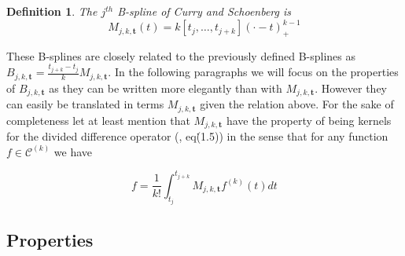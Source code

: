 \documentclass[a4paper, 11pt]{article}
\newtheorem{deftn}{Definition}
\begin{document}
\begin{deftn}
  The $j^{th}$ B-spline of Curry and Schoenberg is
  \begin{equation}
    M_{j,k,\bm{t}}(t) = k [t_j, \ldots, t_{j+k}]{(\cdot-t)}_+^{k-1}
  \end{equation}
\end{deftn}

These B-splines are closely related to the previously defined B-splines as $B_{j, k, \bm{t}} = \frac{t_{j+k}-t_j}{k} 
M_{j,k,\bm{t}}$. In the following paragraphs we will focus on the properties of $B_{j,k,\bm{t}}$ as they can be written 
more elegantly than with $M_{j,k,\bm{t}}$. However they can easily be translated in terms $M_{j,k,\bm{t}}$ given the 
relation above. For the sake of completeness let at least mention that $M_{j,k,\bm{t}}$ have the property of being
kernels for the divided difference operator (\cite{CS66}, eq\.  (1.5)) in the sense that for any function $f \in 
\mathcal{C}^{(k)}$  we have 

\begin{equation*}
  [t_j, \ldots, t_{j+k}]f = \frac{1}{k!} \int_{t_j}^{t_{j+k}} M_{j,k,\bm{t}} f^{(k)}(t) dt
\end{equation*}


\subsection{Properties}

\nocite{*}
\printbibliography%
%
%
\end{document}
